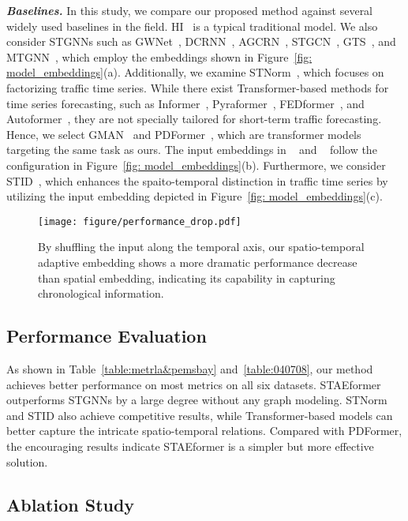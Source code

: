 \documentclass[sigconf]{acmart}
\begin{document}
\textit{\textbf{Baselines.}} 
In this study, we compare our proposed method against several widely used baselines in the field. HI~\cite{HI} is a typical traditional model. We also consider STGNNs such as GWNet~\cite{GWNet}, DCRNN~\cite{DCRNN}, AGCRN~\cite{AGCRN}, STGCN~\cite{STGCN}, GTS~\cite{GTS}, and MTGNN~\cite{MTGNN}, which employ the embeddings shown in Figure~\ref{fig: model_embeddings}(a). Additionally, we examine STNorm~\cite{STNorm}, which focuses on factorizing traffic time series. While there exist Transformer-based methods for time series forecasting, such as Informer~\cite{Informer}, Pyraformer~\cite{Pyraformer}, FEDformer~\cite{FEDformer}, and Autoformer~\cite{Autoformer}, they are not specially tailored for short-term traffic forecasting. Hence, we select GMAN~\cite{GMAN} and PDFormer~\cite{PDFormer}, which are transformer models targeting the same task as ours. The input embeddings in ~\cite{GMAN} and ~\cite{PDFormer} follow the configuration in Figure~\ref{fig: model_embeddings}(b). Furthermore, we consider STID~\cite{STID}, which enhances the spaito-temporal distinction in traffic time series by utilizing the input embedding depicted in Figure~\ref{fig: model_embeddings}(c).

\begin{figure}[!t]
    \centering
    \texttt{[image: figure/performance\_drop.pdf]}
    \caption{By shuffling the input along the temporal axis, our spatio-temporal adaptive embedding shows a more dramatic performance decrease than spatial embedding, indicating its capability in capturing chronological information.}
    \label{fig: performance_drop}
\end{figure}

\subsection{Performance Evaluation}

As shown in Table~\ref{table:metrla&pemsbay} and~\ref{table:040708}, our method achieves better performance on most metrics on all six datasets. STAEformer outperforms STGNNs by a large degree without any graph modeling. STNorm and STID also achieve competitive results, while Transformer-based models can better capture the intricate spatio-temporal relations. Compared with PDFormer, the encouraging results indicate STAEformer is a simpler but more effective solution.

\subsection{Ablation Study}\label{ablation study}
\end{document}
